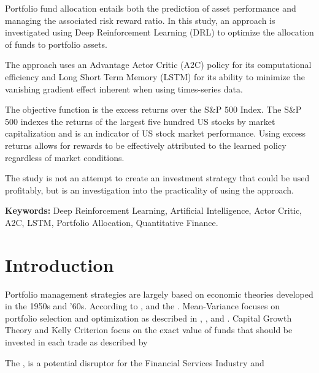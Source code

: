\documentclass[oneside,12pt]{Classes/RoboticsLaTeX}
\begin{document}
\begin{abstracts}
Portfolio fund allocation entails both the prediction of asset performance and managing the associated risk reward ratio. In this study, an approach is investigated using Deep Reinforcement Learning (DRL) to optimize the allocation of funds to portfolio assets.

The approach uses an Advantage Actor Critic (A2C) policy for its computational efficiency  and  Long Short Term Memory (LSTM) for its ability to minimize the vanishing gradient effect inherent when using times-series data.

The objective function is the excess returns over the S\&P 500 Index. The S\&P 500 indexes the returns of the largest five hundred US stocks by market capitalization and is an indicator of US stock market performance. Using excess returns allows for rewards to be effectively attributed to  the learned policy regardless of market conditions.

The study is not an attempt to create an investment strategy that could be used profitably, but is an investigation into the practicality of using the approach.


\textbf{Keywords: } Deep Reinforcement Learning, Artificial Intelligence, Actor Critic, A2C, LSTM, Portfolio Allocation, Quantitative Finance.
\end{abstracts}

\tableofcontents
\listoffigures
\listoftables
\printglossary[title=List of Acronyms,type=\acronymtype]

\mainmatter

\chapter{Introduction}
\label{chap:introduction}
Portfolio management strategies are largely based on economic theories developed in the 1950s and ’60s. According to \citet{LiBin2014OpsA} ,  and the . Mean-Variance focuses on portfolio selection and optimization as described in \citet{MarkowitzHarry1952PS}, \citet{FrancoModigliani1958TCoC}, and \citet{Sharpe94}. Capital Growth Theory and Kelly Criterion focus on the exact value of funds that should be invested in each trade as described by \citep{KellyJ1956Anio}

The  \citep{GomberPeter2018OtFR}, is a potential disruptor for the Financial Services Industry and  \citep{GomberPeter2018OtFR}
\end{document}
